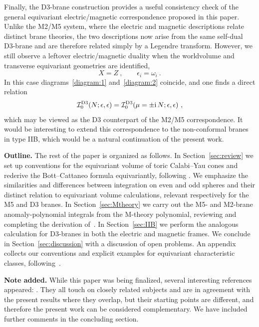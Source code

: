 \documentclass[11pt,a4paper]{article}
\def\cI{{\cal I}}
\def\i{{\rm i}}
\theoremstyle{definition}
\theoremstyle{identity}
\theoremstyle{remark}
\newcommand{\be}{\begin{equation}}
\newcommand{\ee}{\end{equation}}
\newcommand{\e}{\epsilon}
\begin{document}
Finally, the D3-brane construction provides a useful consistency check of the general
equivariant electric/magnetic correspondence proposed in this paper. Unlike the M2/M5 system,
where the electric and magnetic descriptions relate distinct brane theories, the two
descriptions now arise from the same self-dual D3-brane and are therefore related simply by a
Legendre transform. However, we still observe a leftover electric/magnetic duality when the worldvolume and transverse equivariant geometries are identified,
\be
X=Z\ ,\qquad \epsilon_i=\omega_i\ .
\ee
In this case diagrams~\eqref{diagram:1} and~\eqref{diagram:2} coincide, and one
finds a direct relation
\be\label{eq:D3duality}
\cI_0^{\rm D3}(N;\e,\epsilon)
=
\cI_0^{\rm D3}(\mu = \pm \i\,N;\e,\epsilon)\ ,
\ee
which may be viewed as the D3 counterpart of the M2/M5 correspondence. It would be interesting to extend this correspondence to the non-conformal branes in type IIB, which would be a natural continuation of the present work.



\medskip
\noindent\textbf{Outline.} The rest of the paper is organized as follows. In
Section~\ref{sec:review} we set up conventions for the equivariant volume of toric Calabi--Yau
cones and rederive the Bott--Cattaneo formula equivariantly, following \cite{Hosseini:2020vgl}. We emphasize the similarities and differences between integration on even and odd spheres and their distinct relation to equivariant volume calculations, relevant respectively for the M5 and D3 branes. In Section~\ref{sec:Mtheory} we
carry out the M5- and M2-brane anomaly-polynomial integrals from the M-theory polynomial, reviewing and completing the derivation of~\cite{Hristov:2026tde}. In
Section~\ref{sec:IIB} we perform the analogous calculation for D3-branes in both the electric and magnetic frames. We conclude in Section~\ref{sec:discussion}
with a discussion of open problems. An appendix collects our conventions and explicit examples for equivariant characteristic
classes, following~\cite{Cassia:2025aus,Hristov:2026tde}.

\medskip
\noindent\textbf{Note added.} While this paper was being finalized, several interesting references appeared: \cite{Cassani:2026teb,Couzens:2026xmi,BenettiGenolini:2026cdw,BenettiGenolini:2026cyc}. They all touch on closely related subjects and are in agreement with the present results where they overlap, but their starting points are different, and therefore the present work can be considered complementary. We have included further comments in the concluding section.
\end{document}
